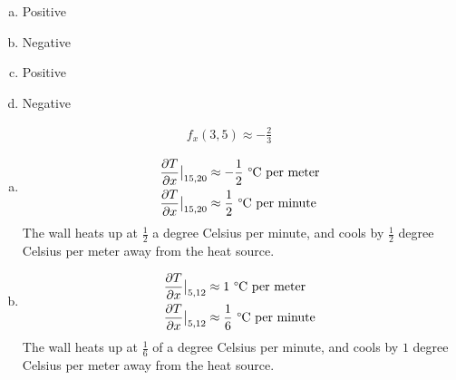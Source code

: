 \documentclass[10pt]{extarticle}
\begin{document}
\begin{problem}{14.1}
\begin{description}[font=\normalfont]
        \begin{enumerate}[(a)]
          \item Positive
          \item Negative
          \item Positive
          \item Negative
        \end{enumerate}
      \item[22:]
        \begin{align*}
          f_x(3,5) \approx -\frac{2}{3}
        \end{align*}
      \item[36:]
        \begin{enumerate}[(a)]
          \item
            \begin{align*}
              \frac{\partial T}{\partial x}\bigr|_{15,20} &\approx -\frac{1}{2}~\text{\textdegree C per meter}\\
              \frac{\partial T}{\partial x}\bigr|_{15,20} &\approx \frac{1}{2}~\text{\textdegree C per minute}
            \end{align*}
            The wall heats up at $\frac{1}{2}$ a degree Celsius per minute, and cools by $\frac{1}{2}$ degree Celsius per meter away from the heat source.
          \item
            \begin{align*}
              \frac{\partial T}{\partial x}\bigr|_{5,12} &\approx 1~\text{\textdegree C per meter}\\
              \frac{\partial T}{\partial x}\bigr|_{5,12} &\approx \frac{1}{6}~\text{\textdegree C per minute}
            \end{align*}
            The wall heats up at $\frac{1}{6}$ of a degree Celsius per minute, and cools by $1$ degree Celsius per meter away from the heat source.
        \end{enumerate}
    \end{description}
  \end{problem}
\end{document}
